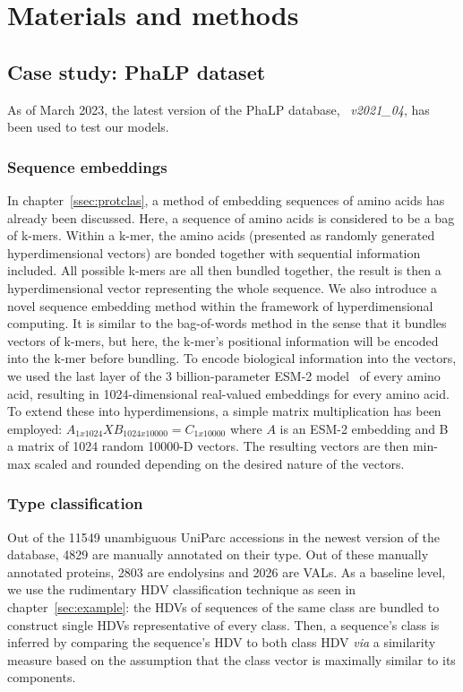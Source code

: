 \chapter[Materials and methods]{Materials and methods}
\section{Case study: PhaLP dataset}
As of March 2023, the latest version of the PhaLP database, ~\textit{v2021\_04}, has been used to test our models.

\subsection*{Sequence embeddings}
In chapter~\ref{ssec:protclas}, a method of embedding sequences of amino acids has already been discussed. Here, a sequence of amino acids is considered to be a bag of k-mers. Within a k-mer, the amino acids (presented as randomly generated hyperdimensional vectors) are bonded together with sequential information included. All possible k-mers are all then bundled together, the result is then a hyperdimensional vector representing the whole sequence. We also introduce a novel sequence embedding method within the framework of hyperdimensional computing. It is similar to the bag-of-words method in the sense that it bundles vectors of k-mers, but here, the k-mer's positional information will be encoded into the k-mer before bundling. 
To encode biological information into the vectors, we used the last layer of the 3 billion-parameter ESM-2 model~\cite{esm2} of every amino acid, resulting in 1024-dimensional real-valued embeddings for every amino acid. To extend these into hyperdimensions, a simple matrix multiplication has been employed: $A_{1x1024}X B_{1024x10000} = C_{1x10000}$ where $A$ is an ESM-2 embedding and B a matrix of 1024 random 10000-D vectors. The resulting vectors are then min-max scaled and rounded depending on the desired nature of the vectors.
\subsection*{Type classification}
Out of the 11549 unambiguous UniParc accessions in the newest version of the database, 4829 are manually annotated on their type. Out of these manually annotated proteins, 2803 are endolysins and 2026 are VALs. As a baseline level, we use the rudimentary HDV classification technique as seen in chapter~\ref{sec:example}: the HDVs of sequences of the same class are bundled to construct single HDVs representative of every class. Then, a sequence's class is inferred by comparing the sequence's HDV to both class HDV \textit{via} a similarity measure based on the assumption that the class vector is maximally similar to its components. 